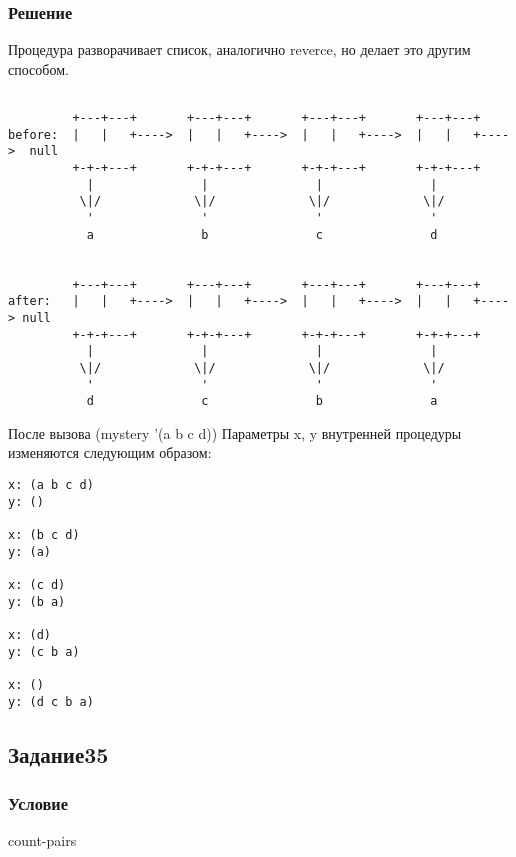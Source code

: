 \documentclass[10pt,a4paper]{article}
\begin{document}
\subsubsection*{Решение}
Процедура разворачивает список, аналогично reverce, но делает это
другим способом.

\begin{lstlisting}

         +---+---+       +---+---+       +---+---+       +---+---+
before:  |   |   +---->  |   |   +---->  |   |   +---->  |   |   +---->  null
         +-+-+---+       +-+-+---+       +-+-+---+       +-+-+---+
           |               |               |               |
          \|/             \|/             \|/             \|/
           '               '               '               '
           a               b               c               d
  
  
         +---+---+       +---+---+       +---+---+       +---+---+
after:   |   |   +---->  |   |   +---->  |   |   +---->  |   |   +----> null
         +-+-+---+       +-+-+---+       +-+-+---+       +-+-+---+
           |               |               |               |
          \|/             \|/             \|/             \|/
           '               '               '               '
           d               c               b               a

\end{lstlisting}
После вызова (mystery '(a b c d))  Параметры x, y внутренней процедуры
изменяются следующим образом: \\
\begin{lstlisting}
x: (a b c d)
y: ()

x: (b c d)
y: (a)

x: (c d)
y: (b a)

x: (d)
y: (c b a)

x: ()
y: (d c b a)
\end{lstlisting}

\subsection*{Задание35}
\subsubsection*{Условие}
count-pairs
\end{document}
